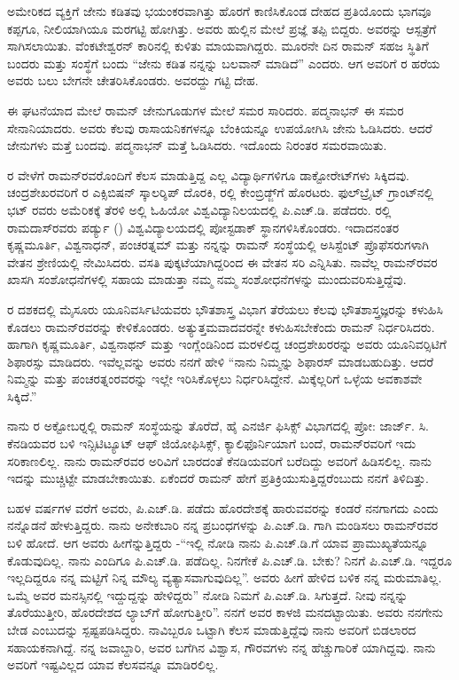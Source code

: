 ಅಮೇರಿಕದ ವ್ಯಕ್ತಿಗೆ ಜೇನು ಕಡಿತವು ಭಯಂಕರವಾಗಿತ್ತು ಹೊರಗೆ ಕಾಣಿಸಿಕೊಂಡ ದೇಹದ ಪ್ರತಿಯೊಂದು ಭಾಗವೂ ಕಪ್ಪಗೂ, ನೀಲಿಯಾಗಿಯೂ ಮರಗಟ್ಟಿ ಹೋಗಿತ್ತು. ಅವರು ಹುಲ್ಲಿನ ಮೇಲೆ ಪ್ರಜ್ಞೆ ತಪ್ಪಿ ಬಿದ್ದರು. ಅವರನ್ನು ಆಸ್ಪತ್ರೆಗೆ ಸಾಗಿಸಲಾಯಿತು. ವೆಂಕಟೇಶ್ವರನ್ ಕಾರಿನಲ್ಲಿ ಕುಳಿತು ಮಾಯವಾಗಿದ್ದರು. ಮೂರನೇ ದಿನ ರಾಮನ್ ಸಹಜ ಸ್ಥಿತಿಗೆ ಬಂದರು ಮತ್ತು ಸಂಸ್ಥೆಗೆ ಬಂದು “ಜೇನು ಕಡಿತ ನನ್ನನ್ನು ಬಲವಾನ್ ಮಾಡಿದೆ” ಎಂದರು. ಆಗ ಅವರಿಗೆ ರ ಹರೆಯ ಅವರು ಬಲು ಬೇಗನೇ ಚೇತರಿಸಿಕೊಂಡರು. ಅವರದ್ದು ಗಟ್ಟಿ ದೇಹ.

ಈ ಘಟನೆಯಾದ ಮೇಲೆ ರಾಮನ್ ಜೇನುಗೂಡುಗಳ ಮೇಲೆ ಸಮರ ಸಾರಿದರು. ಪದ್ಮನಾಭನ್ ಈ ಸಮರ ಸೇನಾನಿಯಾದರು. ಅವರು ಕೆಲವು ರಾಸಾಯನಿಕಗಳನ್ನೂ ಬೆಂಕಿಯನ್ನೂ ಉಪಯೋಗಿಸಿ ಜೇನು ಓಡಿಸಿದರು. ಆದರೆ ಜೇನುಗಳು ಮತ್ತೆ ಬಂದವು. ಪದ್ಮನಾಭನ್ ಮತ್ತೆ ಓಡಿಸಿದರು. ಇದೊಂದು ನಿರಂತರ ಸಮರವಾಯಿತು.



ರ ವೇಳೆಗೆ ರಾಮನ್‍ರವರೊಂದಿಗೆ ಕೆಲಸ ಮಾಡುತ್ತಿದ್ದ ಎಲ್ಲ ವಿದ್ಯಾರ್ಥಿಗಳಿಗೂ ಡಾಕ್ಟೋರೇಟ್‍ಗಳು ಸಿಕ್ಕಿದವು. ಚಂದ್ರಶೇಖರವರಿಗೆ ರ ಎಕ್ಸಿಬಿಷನ್ ಸ್ಕಾಲರ್‍ಶಿಪ್ ದೊರಕಿ, ರಲ್ಲಿ ಕೇಂಬ್ರಿಡ್ಜ್‌ಗೆ ಹೊರಟರು. ಫುಲ್‍ಬ್ರೈಟ್ ಗ್ರಾಂಟ್‍ನಲ್ಲಿ ಭಟ್ ರವರು ಅಮೆರಿಕಕ್ಕೆ ತೆರಳಿ ಅಲ್ಲಿ ಓಹಿಯೋ ವಿಶ್ವವಿದ್ಯಾನಿಲಯದಲ್ಲಿ ಪಿ.ಎಚ್.ಡಿ. ಪಡೆದರು. ರಲ್ಲಿ ರಾಮದಾಸ್‍ರವರು ಪರ್ಡ್ಯು () ವಿಶ್ವವಿದ್ಯಾಲಯದಲ್ಲಿ ಪೋಸ್ಟಡಾಕ್ ಸ್ಥಾನಗಳಿಸಿಕೊಂಡರು. ಇದಾದನಂತರ ಕೃಷ್ಣಮೂರ್ತಿ, ವಿಶ್ವನಾಧನ್, ಪಂಚರತ್ನಮ್ ಮತ್ತು ನನ್ನನ್ನು ರಾಮನ್ ಸಂಸ್ಥೆಯಲ್ಲಿ ಅಸಿಸ್ಟೆಂಟ್ ಪ್ರೊಫೆಸರುಗಳಾಗಿ  ವೇತನ ಶ್ರೇಣಿಯಲ್ಲಿ ನೇಮಿಸಿದರು. ವಸತಿ ಪುಕ್ಕಟೆಯಾಗಿದ್ದರಿಂದ ಈ ವೇತನ ಸರಿ ಎನ್ನಿಸಿತು. ನಾವೆಲ್ಲ ರಾಮನ್‍ರವರ ಖಾಸಗಿ ಸಂಶೋಧನೆಗಳಲ್ಲಿ ಸಹಾಯ ಮಾಡುತ್ತಾ ನಮ್ಮ ನಮ್ಮ ಸಂಶೋಧನೆಗಳನ್ನು ಮುಂದುವರಿಸುತ್ತಿದ್ದೆವು.

ರ ದಶಕದಲ್ಲಿ ಮೈಸೂರು ಯೂನಿವರ್ಸಿಟಿಯವರು ಭೌತಶಾಸ್ತ್ರ ವಿಭಾಗ ತೆರೆಯಲು ಕೆಲವು ಭೌತಶಾಸ್ತ್ರಜ್ಞರನ್ನು ಕಳುಹಿಸಿ ಕೊಡಲು ರಾಮನ್‍ರವರನ್ನು ಕೇಳಿಕೊಂಡರು. ಅತ್ಯುತ್ತಮವಾದವರನ್ನೇ ಕಳುಹಿಸಬೇಕೆಂದು ರಾಮನ್ ನಿರ್ಧರಿಸಿದರು. ಹಾಗಾಗಿ ಕೃಷ್ಣಮೂರ್ತಿ, ವಿಶ್ವನಾಥನ್ ಮತ್ತು ಇಂಗ್ಲೆಂಡಿನಿಂದ ಮರಳಲಿದ್ದ ಚಂದ್ರಶೇಖರರನ್ನು ಅವರು ಯೂನಿವರ್‍ಸಿಟಿಗೆ ಶಿಫಾರಸ್ಸು ಮಾಡಿದರು. ಇವೆಲ್ಲವನ್ನು ಅವರು ನನಗೆ ಹೇಳಿ “ನಾನು ನಿಮ್ಮನ್ನು ಶಿಫಾರಸ್ ಮಾಡಬಹುದಿತ್ತು. ಆದರೆ ನಿಮ್ಮನ್ನು ಮತ್ತು ಪಂಚರತ್ನಂರವರನ್ನು ಇಲ್ಲೇ ಇರಿಸಿಕೊಳ್ಳಲು ನಿರ್ಧರಿಸಿದ್ದೇನೆ. ಮಿಕ್ಕೆಲ್ಲರಿಗೆ ಒಳ್ಳೆಯ ಅವಕಾಶವೇ ಸಿಕ್ಕಿದೆ.”

ನಾನು ರ ಅಕ್ಟೋಬರ್‍ನಲ್ಲಿ ರಾಮನ್ ಸಂಸ್ಥೆಯನ್ನು ತೊರೆದೆ, ಹೈ ಎನರ್ಜಿ ಫಿಸಿಕ್ಸ್ ವಿಭಾಗದಲ್ಲಿ ಪ್ರೋ: ಜಾರ್ಜ್. ಸಿ. ಕೆನಡಿಯವರ ಬಳಿ ಇನ್ಸಿಟಿಟ್ಯೂಟ್ ಆಫ್ ಜಿಯೋಫಿಸಿಕ್ಸ್, ಕ್ಯಾಲಿಫೊರ್ನಿಯಾಗೆ ಬಂದೆ, ರಾಮನ್‍ರವರಿಗೆ ಇದು ಸರಿಕಾಣಲಿಲ್ಲ. ನಾನು ರಾಮನ್‍ರವರ ಅರಿವಿಗೆ ಬಾರದಂತೆ ಕೆನಡಿಯವರಿಗೆ ಬರೆದಿದ್ದು ಅವರಿಗೆ ಹಿಡಿಸಲಿಲ್ಲ. ನಾನು ಇದನ್ನು ಮುಚ್ಚಿಟ್ಟೇ ಮಾಡಬೇಕಾಯಿತು. ಏಕೆಂದರೆ ರಾಮನ್ ಹೇಗೆ ಪ್ರತಿಕ್ರಿಯುಸುತ್ತಿದ್ದರೆಂಬುದು ನನಗೆ ತಿಳಿದಿತ್ತು.

ಬಹಳ ವರ್ಷಗಳ ವರೆಗೆ ಅವರು, ಪಿ.ಎಚ್.ಡಿ. ಪಡೆದು ಹೊರದೇಶಕ್ಕೆ ಹಾರುವವರನ್ನು ಕಂಡರೆ ನನಗಾಗದು ಎಂದು ನನ್ನೊಡನೆ ಹೇಳುತ್ತಿದ್ದರು. ನಾನು ಅನೇಕಬಾರಿ ನನ್ನ ಪ್ರಬಂಧಗಳನ್ನು ಪಿ.ಎಚ್.ಡಿ. ಗಾಗಿ ಮಂಡಿಸಲು ರಾಮನ್‍ರವರ ಬಳಿ ಹೋದೆ. ಆಗ ಅವರು ಹೀಗೆನ್ನುತ್ತಿದ್ದರು -“ಇಲ್ಲಿ ನೋಡಿ ನಾನು ಪಿ.ಎಚ್.ಡಿ.ಗೆ ಯಾವ ಪ್ರಾಮುಖ್ಯತೆಯನ್ನೂ ಕೊಡುವುದಿಲ್ಲ. ನಾನು ಎಂದಿಗೂ ಪಿ.ಎಚ್.ಡಿ. ಪಡೆದಿಲ್ಲ. ನಿನಗೇಕೆ ಪಿ.ಎಚ್.ಡಿ. ಬೇಕು? ನಿನಗೆ ಪಿ.ಎಚ್.ಡಿ. ಇದ್ದರೂ ಇಲ್ಲದಿದ್ದರೂ ನನ್ನ ಮಟ್ಟಿಗೆ ನಿನ್ನ ಮೌಲ್ಯ ವ್ಯತ್ಯಾಸವಾಗುವುದಿಲ್ಲ”. ಅವರು ಹೀಗೆ ಹೇಳಿದ ಬಳಿಕ ನನ್ನ ಮರುಮಾತಿಲ್ಲ. ಒಮ್ಮೆ ಅವರ ಮನಸ್ಸಿನಲ್ಲಿ ಇದ್ದುದ್ದನ್ನು ಹೇಳಿದ್ದರು” ನೋಡಿ ನಿಮಗೆ ಪಿ.ಎಚ್.ಡಿ. ಸಿಗುತ್ತದೆ. ನೀವು ನನ್ನನ್ನು ತೊರೆಯುತ್ತೀರಿ, ಹೊರದೇಶದ ಲ್ಯಾಬ್‍ಗೆ ಹೋಗುತ್ತೀರಿ”. ನನಗೆ ಅವರ ಕಾಳಜಿ ಮನದಟ್ಟಾಯಿತು. ಅವರು ನನಗೇನು ಬೇಡ ಎಂಬುದನ್ನು ಸ್ಪಷ್ಟಪಡಿಸಿದ್ದರು. ನಾವಿಬ್ಬರೂ ಒಟ್ಟಾಗಿ ಕೆಲಸ ಮಾಡುತ್ತಿದ್ದೆವು ನಾನು ಅವರಿಗೆ ಬಿಡಲಾರದ ಸಹಾಯಕನಾಗಿದ್ದೆ. ನನ್ನ ಜವಾಬ್ದಾರಿ, ಅವರ ಬಗೆಗಿನ ವಿಶ್ವಾಸ, ಗೌರವಗಳು ನನ್ನ ಹೆಚ್ಚುಗಾರಿಕೆ ಯಾಗಿದ್ದವು. ನಾನು ಅವರಿಗೆ ಇಷ್ಟವಿಲ್ಲದ ಯಾವ ಕೆಲಸವನ್ನೂ ಮಾಡಿರಲಿಲ್ಲ.

